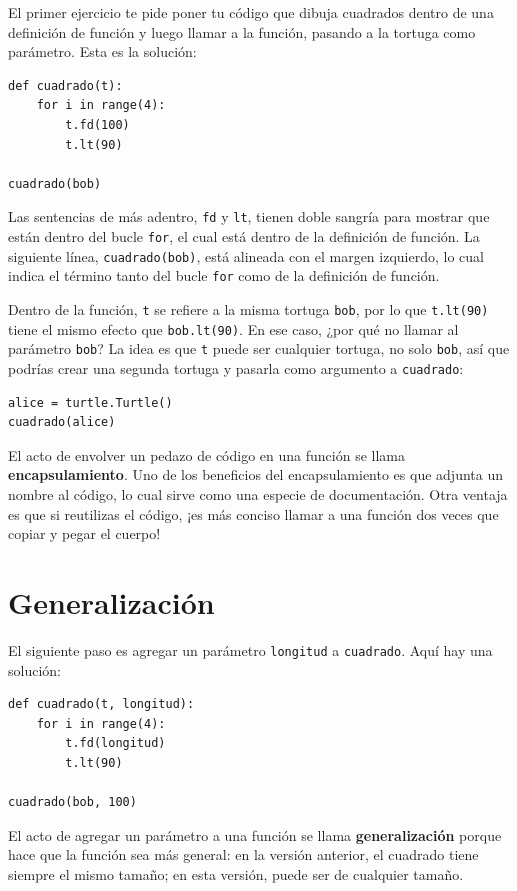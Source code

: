 \documentclass[10pt]{book}
\begin{document}
El primer ejercicio te pide poner tu código que dibuja cuadrados
dentro de una definición de función y luego llamar a la función, pasando
a la tortuga como parámetro.  Esta es la solución:

\begin{verbatim}
def cuadrado(t):
    for i in range(4):
        t.fd(100)
        t.lt(90)

cuadrado(bob)
\end{verbatim}
%
Las sentencias de más adentro, {\tt fd} y {\tt lt}, tienen doble sangría para
mostrar que están dentro del bucle {\tt for}, el cual está dentro de la
definición de función.  La siguiente línea, {\tt cuadrado(bob)}, está alineada con
el margen izquierdo, lo cual indica el término tanto del bucle {\tt for}
como de la definición de función.

Dentro de la función, {\tt t} se refiere a la misma tortuga {\tt bob}, por lo que
{\tt t.lt(90)} tiene el mismo efecto que {\tt bob.lt(90)}.  En ese
caso, ¿por qué no
llamar al parámetro {\tt bob}?  La idea es que {\tt t} puede ser cualquier
tortuga, no solo {\tt bob}, así que podrías crear una segunda tortuga y
pasarla como argumento a {\tt cuadrado}:

\begin{verbatim}
alice = turtle.Turtle()
cuadrado(alice)
\end{verbatim}
%
El acto de envolver un pedazo de código en una función se llama {\bf
encapsulamiento}.  Uno de los beneficios del encapsulamiento es que
adjunta un nombre al código, lo cual sirve como una especie de documentación.
Otra ventaja es que si reutilizas el código, ¡es más conciso
llamar a una función dos veces que copiar y pegar el cuerpo!


\section{Generalización}

El siguiente paso es agregar un parámetro {\tt longitud} a {\tt cuadrado}.
Aquí hay una solución:

\begin{verbatim}
def cuadrado(t, longitud):
    for i in range(4):
        t.fd(longitud)
        t.lt(90)

cuadrado(bob, 100)
\end{verbatim}
%
El acto de agregar un parámetro a una función se llama {\bf generalización}
porque hace que la función sea más general: en la versión
anterior, el cuadrado tiene siempre el mismo tamaño; en esta versión,
puede ser de cualquier tamaño.
\end{document}
